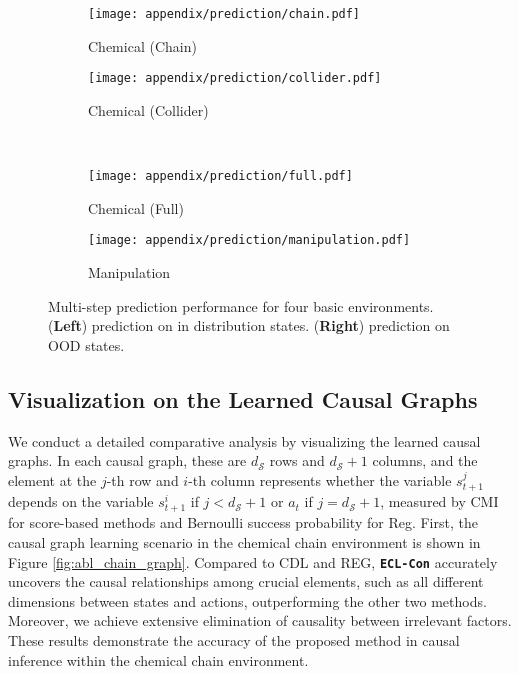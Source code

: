\begin{figure}[h]
\centering
\begin{subfigure}{0.49\linewidth}
\texttt{[image: appendix/prediction/chain.pdf]}
\caption{Chemical (Chain)}
\end{subfigure}
\hfill
\begin{subfigure}{0.49\linewidth}
\centering
\texttt{[image: appendix/prediction/collider.pdf]}
\caption{Chemical (Collider)}
\label{sub2}
\end{subfigure}
\\
\begin{subfigure}{0.49\linewidth}
\centering
\texttt{[image: appendix/prediction/full.pdf]}
\caption{Chemical (Full)}
\label{sub3}
\end{subfigure}
\hfill
\begin{subfigure}{0.49\linewidth}
\centering
\texttt{[image: appendix/prediction/manipulation.pdf]}
\caption{Manipulation}
\label{sub2}
\end{subfigure}
\caption{Multi-step prediction performance for four basic environments. (\textbf{Left}) prediction on in distribution states. (\textbf{Right}) prediction on OOD states.}
\label{fig:abl_prediction}
\end{figure}


\subsection{Visualization on the Learned Causal Graphs}
\label{Visualization on the learned causal graphs}

We conduct a detailed comparative analysis by visualizing the learned causal graphs. In each causal graph, these are $d_{\mathcal{S}}$ rows and $d_{\mathcal{S}}+1$ columns, and the element at the $j$-th row and $i$-th column represents whether the variable $s_{t+1}^{j}$ depends on the variable $s^{i}_{t+1}$ if $j < d_{\mathcal{S}}+1$ or $a_t$ if $j= d_{\mathcal{S}}+1$,  measured by CMI for score-based methods and Bernoulli success probability for Reg. 
First, the causal graph learning scenario in the chemical chain environment is shown in Figure \ref{fig:abl_chain_graph}. Compared to CDL and REG, \texttt{\textbf{ECL-Con}} accurately uncovers the causal relationships among crucial elements, such as all different dimensions between states and actions, outperforming the other two methods. Moreover, we achieve extensive elimination of causality between irrelevant factors. These results demonstrate the accuracy of the proposed method in causal inference within the chemical chain environment.

